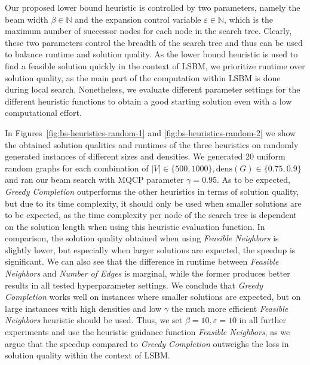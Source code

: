 \documentclass[draft,final]{vutinfth} %
\begin{document}
Our proposed lower bound heuristic is controlled by two parameters, namely the beam width $\beta \in \mathbb{N}$ and the expansion control variable $\varepsilon \in \mathbb{N}$, which is the maximum number of successor nodes for each node in the search tree. Clearly, these two parameters control the breadth of the search tree and thus can be used to balance runtime and solution quality. 
As the lower bound heuristic is used to find a feasible solution quickly in the context of LSBM, we prioritize runtime over solution quality, as the main part of the computation within LSBM is done during local search. Nonetheless, we evaluate different parameter settings for the different heuristic functions to obtain a good starting solution even with a low computational effort. 

In Figures~\ref{fig:bs-heuristics-random-1} and \ref{fig:bs-heuristics-random-2} 
we show the obtained solution qualities and runtimes of the three heuristics on randomly generated instances of different sizes and densities. We generated 20 uniform random graphs for each combination of $|V| \in \{500, 1000\}, \mathrm{dens}(G) \in \{0.75, 0.9\}$ and ran our beam search with MQCP parameter $\gamma=0.95$. 
As to be expected, \emph{Greedy Completion} outperforms the other heuristics in terms of solution quality, but due to its time complexity, it should only be used when smaller solutions are to be expected, as the time complexity per node of the search tree is dependent on the solution length when using this heuristic evaluation function. 
In comparison, the solution quality obtained when using \emph{Feasible Neighbors} is slightly lower, but especially when larger solutions are expected, the speedup is significant.  
We can also see that the difference in runtime between \emph{Feasible Neighbors} and \emph{Number of Edges} is marginal, while the former produces better results in all tested hyperparameter settings. 
We conclude that \emph{Greedy Completion} works well on instances where smaller solutions are expected, but on large instances with high densities and low $\gamma$ the much more efficient \emph{Feasible Neighbors} heuristic should be used. 
Thus, we set $\beta=10, \varepsilon=10$ in all further experiments and use the heuristic guidance function \emph{Feasible Neighbors}, as we argue that the speedup compared to \emph{Greedy Completion} outweighs the loss in solution quality within the context of LSBM. 
\end{document}
